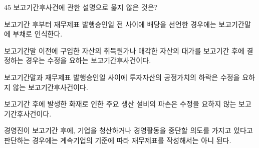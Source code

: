 \begin{question}{45}
보고기간후사건에 관한 설명으로 옳지 않은 것은?
\begin{choices}
  \item 보고기간 후부터 재무제표 발행승인일 전 사이에 배당을 선언한 경우에는 보고기간말에 부채로 인식한다.
  \item 보고기간말 이전에 구입한 자산의 취득원가나 매각한 자산의 대가를 보고기간 후에 결정하는 경우는 수정을 요하는 보고기간후사건이다.
  \item 보고기간말과 재무제표 발행승인일 사이에 투자자산의 공정가치의 하락은 수정을 요하지 않는 보고기간후사건이다.
  \item 보고기간 후에 발생한 화재로 인한 주요 생산 설비의 파손은 수정을 요하지 않는 보고기간후사건이다.
  \item 경영진이 보고기간 후에, 기업을 청산하거나 경영활동을 중단할 의도를 가지고 있다고 판단하는 경우에는 계속기업의 기준에 따라 재무제표를 작성해서는 아니 된다.
\end{choices}
\end{question}
